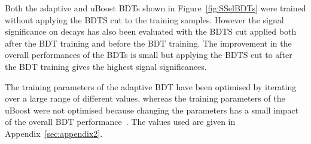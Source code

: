 Both the adaptive and uBoost BDTs shown in Figure~\ref{fig:SSelBDTs} were trained without applying the BDTS cut to the training samples. However the signal significance on \bhh decays has also been evaluated with the BDTS cut applied both after the BDT training and before the BDT training. The improvement in the overall performances of the BDTs is small but applying the BDTS cut to \bhh after the BDT training gives the highest signal significances. 

The training parameters of the adaptive BDT have been optimised by iterating over a large range of different values, whereas the training parameters of the uBoost were not optimised because changing the parameters has a small impact of the overall BDT performance~\cite{Stevens:2013dya}. The values used are given in Appendix~\ref{sec:appendix2}. 

